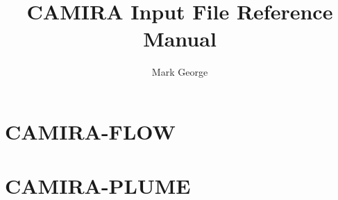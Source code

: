 \documentclass[11pt]{article}
\begin{document}
\renewcommand{\thepage}{\roman{page}}

\title{CAMIRA Input File Reference Manual}
\author{Mark George}
\date{}

\maketitle
\newpage



\newpage
\renewcommand{\contentsname}{Contents}
\tableofcontents
\newpage


\setcounter{page}{1}
\renewcommand{\thepage}{\arabic{page}}


\part{CAMIRA-FLOW}


\newpage
\clearpage


\newpage
\clearpage


\newpage
\clearpage


\newpage
\clearpage


\newpage
\clearpage


\newpage
\clearpage


\newpage
\clearpage


\newpage
\clearpage


\newpage
\clearpage


\part{CAMIRA-PLUME}


\newpage
\clearpage


\newpage
\clearpage


\newpage
\clearpage


\newpage
\clearpage


\newpage
\clearpage


\newpage
\clearpage


\newpage
\clearpage


\newpage
\clearpage
\end{document}
